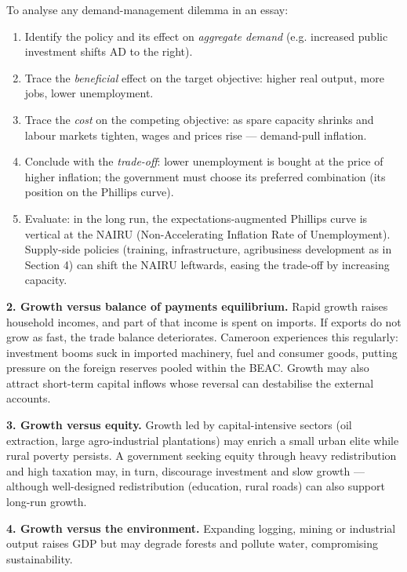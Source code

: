 \documentclass[11pt]{article}
\begin{document}
\begin{methode}
To analyse any demand-management dilemma in an essay:
\begin{enumerate}
\item Identify the policy and its effect on \emph{aggregate demand} (e.g. increased public investment shifts AD to the right).
\item Trace the \emph{beneficial} effect on the target objective: higher real output, more jobs, lower unemployment.
\item Trace the \emph{cost} on the competing objective: as spare capacity shrinks and labour markets tighten, wages and prices rise --- demand-pull inflation.
\item Conclude with the \emph{trade-off}: lower unemployment is bought at the price of higher inflation; the government must choose its preferred combination (its position on the Phillips curve).
\item Evaluate: in the long run, the expectations-augmented Phillips curve is vertical at the NAIRU (Non-Accelerating Inflation Rate of Unemployment). Supply-side policies (training, infrastructure, agribusiness development as in Section 4) can shift the NAIRU leftwards, easing the trade-off by increasing capacity.
\end{enumerate}
\end{methode}

\textbf{2. Growth versus balance of payments equilibrium.} Rapid growth raises household incomes, and part of that income is spent on imports. If exports do not grow as fast, the trade balance deteriorates. Cameroon experiences this regularly: investment booms suck in imported machinery, fuel and consumer goods, putting pressure on the foreign reserves pooled within the BEAC. Growth may also attract short-term capital inflows whose reversal can destabilise the external accounts.

\textbf{3. Growth versus equity.} Growth led by capital-intensive sectors (oil extraction, large agro-industrial plantations) may enrich a small urban elite while rural poverty persists. A government seeking equity through heavy redistribution and high taxation may, in turn, discourage investment and slow growth --- although well-designed redistribution (education, rural roads) can also support long-run growth.

\textbf{4. Growth versus the environment.} Expanding logging, mining or industrial output raises GDP but may degrade forests and pollute water, compromising sustainability.
\end{document}
